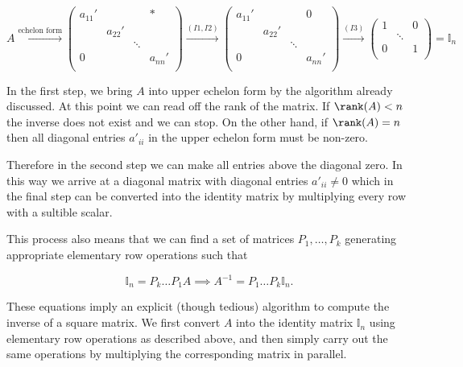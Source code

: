 \documentclass[a4paper,12pt]{report}
\begin{document}
\begin{equation}
    A \xrightarrow{\text{echelon form} } \begin{pmatrix}
        a_{11}'  &  &  & * \\
         & a_{22}'  &  &   \\
         &  & \ddots  &   \\
        0 &  &  & a_{nn}'   \\
    \end{pmatrix} \xrightarrow{(I1,I2)}  \begin{pmatrix}
        a_{11}'  &  &  & 0 \\
         & a_{22}'  &  &   \\
         &  & \ddots  &   \\
        0 &  &  & a_{nn}'   \\
    \end{pmatrix} \xrightarrow{(I3)} \begin{pmatrix}
        1 &  & 0  \\
         & \ddots  &   \\
        0 &  & 1 \\
    \end{pmatrix} = \mathbb{I}_{n} 
\end{equation}

In the first step, we bring \(A\) into upper echelon form by the algorithm already discussed. At this point we can read off the rank of the matrix. If \(\rank (A)<n\) the inverse does not exist and we can stop. On the other hand, if \(\rank (A) = n\) then all diagonal entries \(a'_{ii} \) in the upper echelon form must be non-zero.

Therefore in the second step we can make all entries above the diagonal zero. In this way we arrive at a diagonal matrix with diagonal entries \(a'_{ii} \neq 0 \) which in the final step can be converted into the identity matrix by multiplying every row with a sultible scalar. 

This process also means that we can find a set of matrices \(P_{1} ,\ldots ,P_{k}\) generating appropriate elementary row operations such that 

\begin{equation}
    \mathbb{I}_{n} = P_{k} \ldots P_{1}A \implies A^{-1} = P_{1} \ldots P_{k} \mathbb{I}_{n}.    
\end{equation}

These equations imply an explicit (though tedious) algorithm to compute the inverse of a square matrix. We first convert \(A\) into the identity matrix \(\mathbb{I}_{n} \) using elementary row operations as described above, and then simply carry out the same operations by multiplying the corresponding matrix in parallel. 
\end{document}
